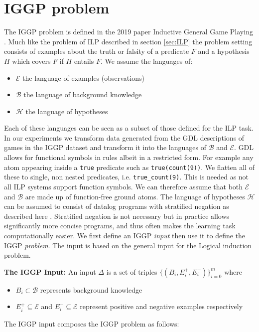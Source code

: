\chapter{IGGP problem}
\label{ch:IGGP}

The IGGP problem is defined in the 2019 paper Inductive General Game Playing \cite{Cropper/IGGP}. Much like the problem of ILP described in section \ref{sec:ILP} the problem setting consists of examples about the truth or falsity of a predicate $F$ and a hypothesis $H$ which covers $F$ if $H$ entails $F$. We assume the languages of:
\begin{itemize}
\item $\mathscr{E}$ the language of examples (observations)
\item $\mathscr{B}$ the language of background knowledge
\item $\mathscr{H}$ the language of hypotheses
\end{itemize}
Each of these languages can be seen as a subset of those defined for the ILP task. In our experiments we transform data generated from the GDL descriptions of games in the IGGP dataset and transform it into the languages of $\mathscr{B}$ and $\mathscr{E}$. GDL allows for functional symbols in rules albeit in a restricted form. For example any atom appearing inside a \texttt{true} predicate such as \texttt{true(count(9))}. We flatten all of these to single, non nested predicates, i.e. \verb|true_count(9)|. This is needed as not all ILP systems support function symbols. We can therefore assume that both $\mathscr{E}$ and $\mathscr{B}$ are made up of function-free ground atoms. The language of hypotheses $\mathscr{H}$ can be assumed to consist of datalog programs with stratified negation as described here \cite{Kenneth}. Stratified negation is not necessary but in practice allows significantly more concise programs, and thus often makes the learning task computationally easier. We first define an IGGP \textit{input} then use it to define the IGGP \textit{problem}. The input is based on the general input for the Logical induction problem.

\textbf{The IGGP Input:} An input $\Delta$ is a set of triples $\{(B_i,E_i^+,E_i^-)\}_{i=0}^m$ where
\begin{itemize}
\item $B_i \subset \mathscr{B}$ represents background knowledge
\item $E_i^+ \subseteq \mathscr{E}$ and $E_i^- \subseteq \mathscr{E}$ represent positive and negative examples respectively
\end{itemize}
The IGGP input composes the IGGP problem as follows:

